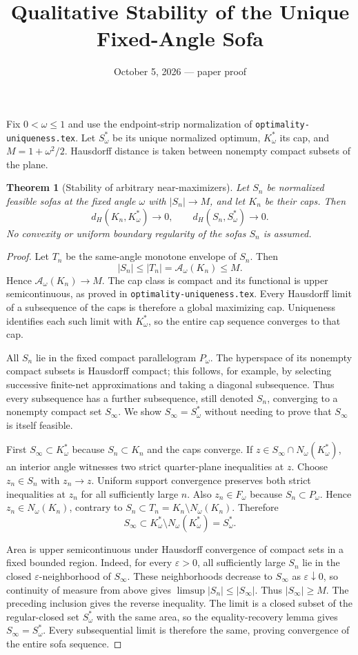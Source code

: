 \documentclass[11pt]{article}
\title{Qualitative Stability of the Unique Fixed-Angle Sofa}
\author{}\date{October 5, 2026 --- paper proof}
\newtheorem{theorem}{Theorem}
\begin{document}
\maketitle
Fix $0<\omega\le1$ and use the endpoint-strip normalization of \texttt{optimality-uniqueness.tex}. Let $S_\omega^*$ be its unique normalized optimum, $K_\omega^*$ its cap, and $M=1+\omega^2/2$. Hausdorff distance is taken between nonempty compact subsets of the plane.

\begin{theorem}[Stability of arbitrary near-maximizers]
Let $S_n$ be normalized feasible sofas at the fixed angle $\omega$ with $|S_n|\to M$, and let $K_n$ be their caps. Then
\[
 d_H(K_n,K_\omega^*)\longrightarrow0,\qquad
 d_H(S_n,S_\omega^*)\longrightarrow0.
\]
No convexity or uniform boundary regularity of the sofas $S_n$ is assumed.
\end{theorem}
\begin{proof}
Let $T_n$ be the same-angle monotone envelope of $S_n$. Then
\[
 |S_n|\le |T_n|=\mathcal A_\omega(K_n)\le M.
\]
Hence $\mathcal A_\omega(K_n)\to M$. The cap class is compact and its functional is upper semicontinuous, as proved in \texttt{optimality-uniqueness.tex}. Every Hausdorff limit of a subsequence of the caps is therefore a global maximizing cap. Uniqueness identifies each such limit with $K_\omega^*$, so the entire cap sequence converges to that cap.

All $S_n$ lie in the fixed compact parallelogram $P_\omega$. The hyperspace of its nonempty compact subsets is Hausdorff compact; this follows, for example, by selecting successive finite-net approximations and taking a diagonal subsequence. Thus every subsequence has a further subsequence, still denoted $S_n$, converging to a nonempty compact set $S_\infty$. We show $S_\infty=S_\omega^*$ without needing to prove that $S_\infty$ is itself feasible.

First $S_\infty\subset K_\omega^*$ because $S_n\subset K_n$ and the caps converge. If $z\in S_\infty\cap N_\omega(K_\omega^*)$, an interior angle witnesses two strict quarter-plane inequalities at $z$. Choose $z_n\in S_n$ with $z_n\to z$. Uniform support convergence preserves both strict inequalities at $z_n$ for all sufficiently large $n$. Also $z_n\in F_\omega$ because $S_n\subset P_\omega$. Hence $z_n\in N_\omega(K_n)$, contrary to $S_n\subset T_n=K_n\setminus N_\omega(K_n)$. Therefore
\[
 S_\infty\subset K_\omega^*\setminus N_\omega(K_\omega^*)=S_\omega^*.
\]

Area is upper semicontinuous under Hausdorff convergence of compact sets in a fixed bounded region. Indeed, for every $\varepsilon>0$, all sufficiently large $S_n$ lie in the closed $\varepsilon$-neighborhood of $S_\infty$. These neighborhoods decrease to $S_\infty$ as $\varepsilon\downarrow0$, so continuity of measure from above gives $\limsup|S_n|\le|S_\infty|$. Thus $|S_\infty|\ge M$. The preceding inclusion gives the reverse inequality. The limit is a closed subset of the regular-closed set $S_\omega^*$ with the same area, so the equality-recovery lemma gives $S_\infty=S_\omega^*$. Every subsequential limit is therefore the same, proving convergence of the entire sofa sequence.
\end{proof}
\end{document}
